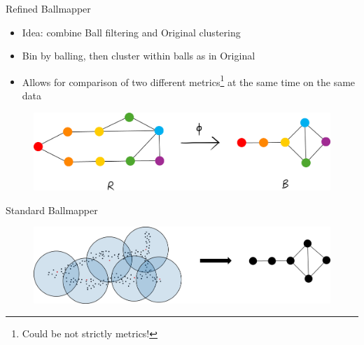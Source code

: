 \documentclass{beamer}
\begin{document}
\begin{frame}{Refined Ballmapper}
  \begin{itemize}
    \item Idea: combine Ball filtering and Original clustering
    \item Bin by balling, then cluster within balls as in Original
    \item Allows for comparison of two different metrics\footnote{Could be not strictly metrics!} at the same time on the same data
  \end{itemize}
  \begin{figure}
    \begin{center}
      \includegraphics[width=1\textwidth]{graphhomo2.png}
    \end{center}
  \end{figure}
  
\end{frame}

\begin{frame}{Standard Ballmapper}
  \begin{figure}
    \begin{center}
      \includegraphics[width=1\textwidth]{prerefined.png}
    \end{center}
  \end{figure}
\end{frame}
\end{document}
